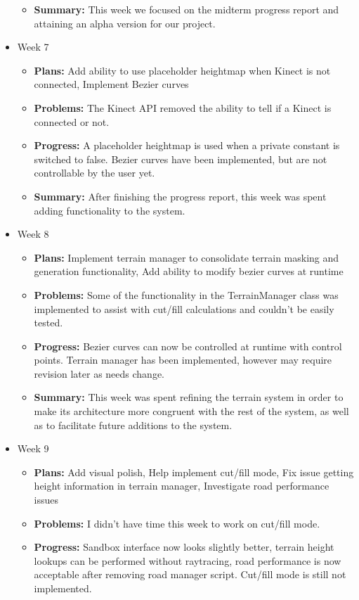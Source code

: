 \documentclass[onecolumn, draftclsnofoot,10pt, compsoc]{IEEEtran}
\begin{document}
\begin{itemize}
\begin{itemize}
    \item \textbf{Summary:} This week we focused on the midterm progress report and attaining an alpha version for our project.
	\end{itemize}
\item Week 7
	\begin{itemize}
	\item \textbf{Plans:} Add ability to use placeholder heightmap when Kinect is not connected, Implement Bezier curves
    \item \textbf{Problems:} The Kinect API removed the ability to tell if a Kinect is connected or not.
    \item \textbf{Progress:} A placeholder heightmap is used when a private constant is switched to false. Bezier curves have been implemented, but are not controllable by the user yet.
    \item \textbf{Summary:} After finishing the progress report, this week was spent adding functionality to the system.
	\end{itemize}
\item Week 8
	\begin{itemize}
	\item \textbf{Plans:} Implement terrain manager to consolidate terrain masking and generation functionality, Add ability to modify bezier curves at runtime
    \item \textbf{Problems:} Some of the functionality in the TerrainManager class was implemented to assist with cut/fill calculations and couldn't be easily tested.
    \item \textbf{Progress:} Bezier curves can now be controlled at runtime with control points. Terrain manager has been implemented, however may require revision later as needs change.
    \item \textbf{Summary:} This week was spent refining the terrain system in order to make its architecture more congruent with the rest of the system, as well as to facilitate future additions to the system.
	\end{itemize}
\item Week 9
	\begin{itemize}
	\item \textbf{Plans:} Add visual polish, Help implement cut/fill mode, Fix issue getting height information in terrain manager, Investigate road performance issues
    \item \textbf{Problems:} I didn't have time this week to work on cut/fill mode.
    \item \textbf{Progress:} Sandbox interface now looks slightly better, terrain height lookups can be performed without raytracing, road performance is now acceptable after removing road manager script. Cut/fill mode is still not implemented.

\end{itemize}
\end{itemize}
\end{document}
